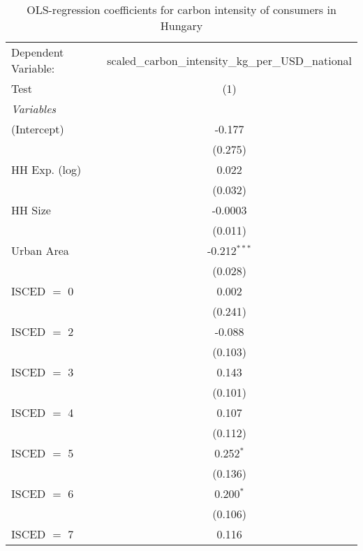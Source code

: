 
\begin{table}[htbp!]
   \centering
   \small
   \begin{adjustbox}{width = 1\textwidth, max height = 0.95\textheight, center}
      \begin{threeparttable}[b]
         \caption{\label{tab:OLS_1_HUN} OLS-regression coefficients for carbon intensity of consumers in Hungary}
         \begin{tabular}{lc}
            \tabularnewline \midrule \midrule
            Dependent Variable: & scaled\_carbon\_intensity\_kg\_per\_USD\_national\\        
            Test                & (1)\\  
            \midrule
            \emph{Variables}\\
            (Intercept)         & -0.177\\   
                                & (0.275)\\   
            HH Exp. (log)       & 0.022\\   
                                & (0.032)\\   
            HH Size             & -0.0003\\   
                                & (0.011)\\   
            Urban Area          & -0.212$^{***}$\\   
                                & (0.028)\\   
            ISCED $=$ 0         & 0.002\\   
                                & (0.241)\\   
            ISCED $=$ 2         & -0.088\\   
                                & (0.103)\\   
            ISCED $=$ 3         & 0.143\\   
                                & (0.101)\\   
            ISCED $=$ 4         & 0.107\\   
                                & (0.112)\\   
            ISCED $=$ 5         & 0.252$^{*}$\\   
                                & (0.136)\\   
            ISCED $=$ 6         & 0.200$^{*}$\\   
                                & (0.106)\\   
            ISCED $=$ 7         & 0.116\\   

\end{tabular}
\end{threeparttable}
\end{adjustbox}
\end{table}

